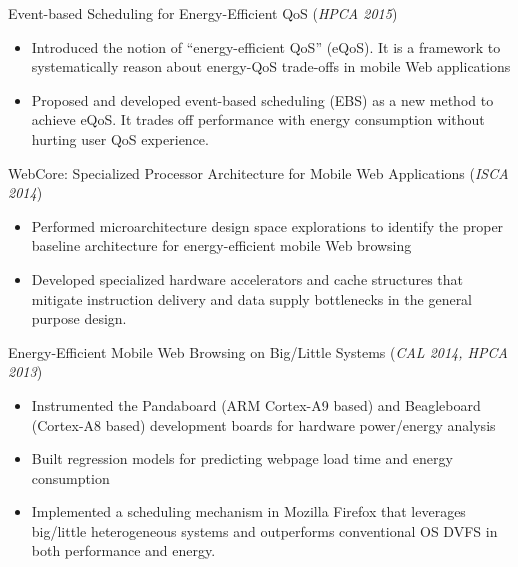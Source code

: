\documentclass[margin, 9pt]{res} %
\begin{document}
\begin{resume}
\medskip
Event-based Scheduling for Energy-Efficient QoS \hfill(\textit{HPCA 2015})\\
\vspace*{-10pt}
\begin{itemize}[leftmargin=*] \itemsep -3pt
\vspace*{-5pt}
	\item Introduced the notion of ``energy-efficient QoS'' (eQoS). It is a framework to systematically reason about energy-QoS trade-offs in mobile Web applications
	\item Proposed and developed event-based scheduling (EBS) as a new method to achieve eQoS. It trades off performance with energy consumption without hurting user QoS experience.
\end{itemize}

\medskip
WebCore: Specialized Processor Architecture for Mobile Web Applications \hfill(\textit{ISCA 2014})\\
\vspace*{-10pt}
\begin{itemize}[leftmargin=*] \itemsep -3pt
\vspace*{-5pt}
	\item Performed microarchitecture design space explorations to identify the proper baseline architecture for energy-efficient mobile Web browsing
	\item Developed specialized hardware accelerators and cache structures that mitigate instruction delivery and data supply bottlenecks in the general purpose design.
\end{itemize}

\medskip
Energy-Efficient Mobile Web Browsing on Big/Little Systems \hfill(\textit{CAL 2014, HPCA 2013})\\
\vspace*{-10pt}
\begin{itemize}[leftmargin=*] \itemsep -3pt
\vspace*{-5pt}
	\item Instrumented the Pandaboard (ARM Cortex-A9 based) and Beagleboard (Cortex-A8 based) development boards for hardware power/energy analysis
	\item Built regression models for predicting webpage load time and energy consumption
	\item Implemented a scheduling mechanism in Mozilla Firefox that leverages big/little heterogeneous systems and outperforms conventional OS DVFS in both performance and energy.
\end{itemize}


\end{resume}
\end{document}
